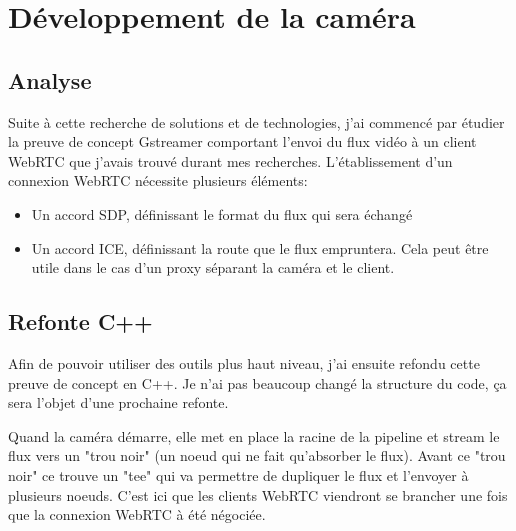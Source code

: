 \documentclass[12pt, a4paper]{report}
\begin{document}
\section{Développement de la caméra}
\subsection{Analyse}
Suite à cette recherche de solutions et de technologies, j'ai commencé par étudier la preuve de concept Gstreamer comportant l'envoi du flux vidéo à un client WebRTC que j'avais trouvé durant mes recherches.\newline
L'établissement d'un connexion WebRTC nécessite plusieurs éléments:
\begin{itemize}
    \item Un accord SDP, définissant le format du flux qui sera échangé
    \item Un accord ICE, définissant la route que le flux empruntera. Cela peut être utile dans le cas d'un proxy séparant la caméra et le client.
\end{itemize}
\subsection{Refonte C++}
Afin de pouvoir utiliser des outils plus haut niveau, j'ai ensuite refondu cette preuve de concept en C++.\newline
Je n'ai pas beaucoup changé la structure du code, ça sera l'objet d'une prochaine refonte.\newline

Quand la caméra démarre, elle met en place la racine de la pipeline et stream le flux vers un "trou noir" (un noeud qui ne fait qu'absorber le flux). Avant ce "trou noir" ce trouve un "tee" qui va permettre de dupliquer le flux et l'envoyer à plusieurs noeuds. C'est ici que les clients WebRTC viendront se brancher une fois que la connexion WebRTC à été négociée.
\end{document}
